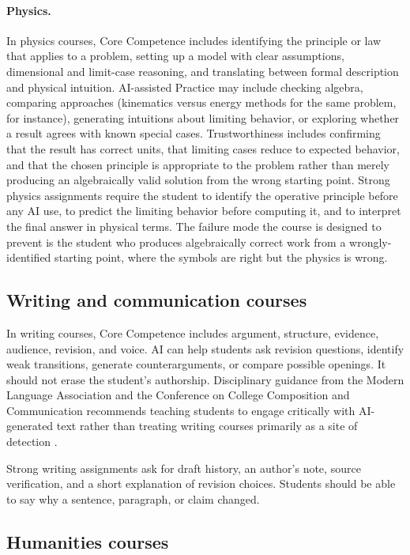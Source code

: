 \documentclass{SIAMbook2023}
\begin{document}
\paragraph{Physics.} In physics courses, Core Competence includes identifying the principle or law that applies to a problem, setting up a model with clear assumptions, dimensional and limit-case reasoning, and translating between formal description and physical intuition. AI-assisted Practice may include checking algebra, comparing approaches (kinematics versus energy methods for the same problem, for instance), generating intuitions about limiting behavior, or exploring whether a result agrees with known special cases. Trustworthiness includes confirming that the result has correct units, that limiting cases reduce to expected behavior, and that the chosen principle is appropriate to the problem rather than merely producing an algebraically valid solution from the wrong starting point. Strong physics assignments require the student to identify the operative principle before any AI use, to predict the limiting behavior before computing it, and to interpret the final answer in physical terms. The failure mode the course is designed to prevent is the student who produces algebraically correct work from a wrongly-identified starting point, where the symbols are right but the physics is wrong.

\subsection{Writing and communication courses}
\label{i:subsec:writing}%

In writing courses, Core Competence includes argument, structure, evidence, audience, revision, and voice. AI can help students ask revision questions, identify weak transitions, generate counterarguments, or compare possible openings. It should not erase the student's authorship. Disciplinary guidance from the Modern Language Association and the Conference on College Composition and Communication recommends teaching students to engage critically with AI-generated text rather than treating writing courses primarily as a site of detection \citep{mlacccc2023task}.

Strong writing assignments ask for draft history, an author's note, source verification, and a short explanation of revision choices. Students should be able to say why a sentence, paragraph, or claim changed.

\subsection{Humanities courses}
\label{i:subsec:humanities}
\end{document}
